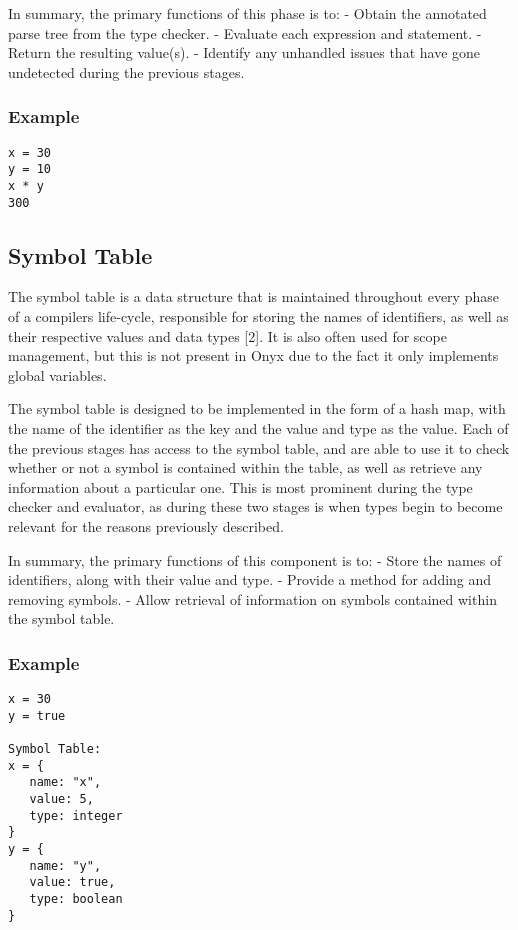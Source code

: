 \documentclass[
]{report}
\begin{document}
In summary, the primary functions of this phase is to: - Obtain the
annotated parse tree from the type checker. - Evaluate each expression
and statement. - Return the resulting value(s). - Identify any unhandled
issues that have gone undetected during the previous stages.

\subsubsection{Example}
\begin{verbatim}
x = 30
y = 10
x * y
300
\end{verbatim}

\subsection{Symbol Table}
The symbol table is a data structure that is maintained throughout every
phase of a compilers life-cycle, responsible for storing the names of
identifiers, as well as their respective values and data types {[}2{]}.
It is also often used for scope management, but this is not present in
Onyx due to the fact it only implements global variables.

The symbol table is designed to be implemented in the form of a hash
map, with the name of the identifier as the key and the value and type
as the value. Each of the previous stages has access to the symbol
table, and are able to use it to check whether or not a symbol is
contained within the table, as well as retrieve any information about a
particular one. This is most prominent during the type checker and
evaluator, as during these two stages is when types begin to become
relevant for the reasons previously described.

In summary, the primary functions of this component is to: - Store the
names of identifiers, along with their value and type. - Provide a
method for adding and removing symbols. - Allow retrieval of information
on symbols contained within the symbol table.

\subsubsection{Example}
\begin{verbatim}
x = 30
y = true

Symbol Table:
x = {
   name: "x",
   value: 5,
   type: integer
}
y = {
   name: "y",
   value: true,
   type: boolean
}
\end{verbatim}
\end{document}
